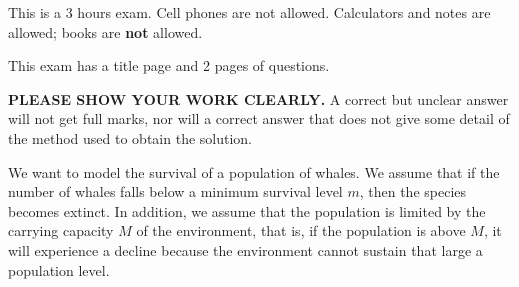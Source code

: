 \documentclass[12pt]{exam}
\begin{document}
This is a 3 hours exam. Cell phones are
not allowed. Calculators and notes are allowed; books are {\bf not} allowed.

\vspace{.1in} This exam has a title page and
2 pages of questions.

\vspace{.2in} {\bf PLEASE SHOW YOUR WORK CLEARLY.}
A correct but unclear answer will not get full marks, nor will a correct answer
that does not give some detail of the method used to obtain the solution.


\vspace{.5in}
\begin{center}
\gradetable[v]
\end{center}



\begin{questions}
\newpage
\question[20] We want to model the survival of a population of whales. We assume
that if the number of whales falls below a minimum survival level $m$, then the
species becomes extinct. In addition, we assume that the population is limited
by the carrying capacity $M$ of the environment, that is, if the population is
above $M$, it will experience a decline because the environment cannot sustain
that large a population level.


\end{questions}
\end{document}
